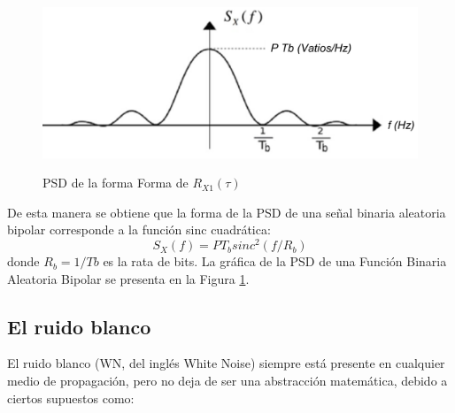 \begin{figure}[h!]
	\captionsetup{justification = raggedright, singlelinecheck = false}
	\caption{ PSD de la forma Forma de $R_{X1}(\tau)$} 
	\centering
	\includegraphics[scale=0.4]{Imagenes/PSD.png}
	\label{fig:PSD}
\end{figure}
De esta manera se obtiene que la forma de la PSD de una señal binaria aleatoria bipolar corresponde a la función sinc cuadrática:
\begin{equation} \label{equ_treintasietess}
	 S_X(f)=P T_b sinc^2(f/R_b)
\end{equation}
donde $R_b=1/Tb$ es la rata de bits. La gráfica de la PSD de una Función Binaria Aleatoria Bipolar se presenta en la Figura \ref{fig:PSD}.

\subsection{El ruido blanco}

El ruido blanco (WN, del inglés White Noise) siempre está presente en cualquier medio de propagación, pero no deja de ser una abstracción matemática, debido a ciertos supuestos como: 

